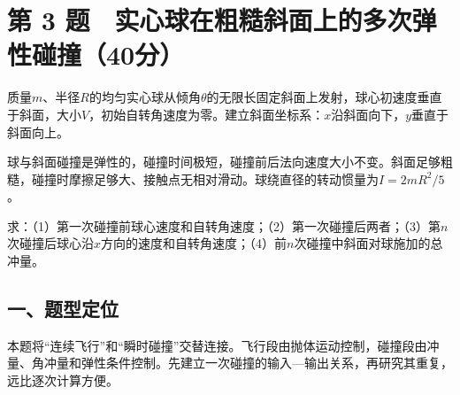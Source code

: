 \documentclass[12pt,a4paper,fontset=fandol]{ctexart}
\begin{document}
\section{第 3
题　实心球在粗糙斜面上的多次弹性碰撞（40分）}\label{ux7b2c-3-ux9898-ux5b9eux5fc3ux7403ux5728ux7c97ux7cd9ux659cux9762ux4e0aux7684ux591aux6b21ux5f39ux6027ux78b0ux649e40ux5206}

质量\(m\)、半径\(R\)的均匀实心球从倾角\(\theta\)的无限长固定斜面上发射，球心初速度垂直于斜面，大小\(V\)，初始自转角速度为零。建立斜面坐标系：\(x\)沿斜面向下，\(y\)垂直于斜面向上。

球与斜面碰撞是弹性的，碰撞时间极短，碰撞前后法向速度大小不变。斜面足够粗糙，碰撞时摩擦足够大、接触点无相对滑动。球绕直径的转动惯量为\(I=2mR^2/5\)。

\begin{center}
\begin{minipage}{\linewidth}
\centering\begingroup{}
\ifdim\wd\diagrambox>.88\linewidth
\sbox{\diagrambox}{\resizebox{.88\linewidth}{!}{\usebox{\diagrambox}}}\fi
\ifdim\ht\diagrambox>.38\textheight
\resizebox{!}{.38\textheight}{\usebox{\diagrambox}}
\else\usebox{\diagrambox}\fi
\par{}\endgroup\end{minipage}\end{center}

求：（1）第一次碰撞前球心速度和自转角速度；（2）第一次碰撞后两者；（3）第\(n\)次碰撞后球心沿\(x\)方向的速度和自转角速度；（4）前\(n\)次碰撞中斜面对球施加的总冲量。

\subsection{一、题型定位}\label{ux4e00ux9898ux578bux5b9aux4f4d-2}

本题将``连续飞行''和``瞬时碰撞''交替连接。飞行段由抛体运动控制，碰撞段由冲量、角冲量和弹性条件控制。先建立一次碰撞的输入---输出关系，再研究其重复，远比逐次计算方便。
\end{document}
